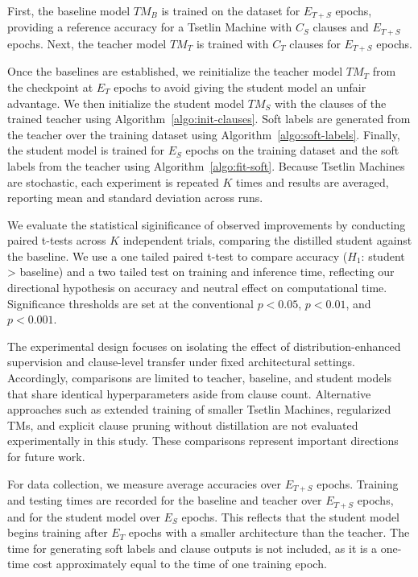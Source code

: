 \documentclass[sn-mathphys-num]{sn-jnl}%
\theoremstyle{thmstyleone}%
\theoremstyle{thmstyletwo}%
\theoremstyle{thmstylethree}%
\begin{document}
First, the baseline model $TM_B$ is trained on the dataset for $E_{T+S}$ epochs, providing a reference accuracy for a Tsetlin Machine with $C_S$ clauses and $E_{T+S}$ epochs. Next, the teacher model $TM_T$ is trained with $C_T$ clauses for $E_{T+S}$ epochs.

Once the baselines are established, we reinitialize the teacher model $TM_T$ from the checkpoint at $E_T$ epochs to avoid giving the student model an unfair advantage. We then initialize the student model $TM_S$ with the clauses of the trained teacher using Algorithm~\ref{algo:init-clauses}. Soft labels are generated from the teacher over the training dataset using Algorithm~\ref{algo:soft-labels}. Finally, the student model is trained for $E_S$ epochs on the training dataset and the soft labels from the teacher using Algorithm~\ref{algo:fit-soft}. Because Tsetlin Machines are stochastic, each experiment is repeated $K$ times and results are averaged, reporting mean and standard deviation across runs. 

We evaluate the statistical siginificance of observed improvements by conducting paired t-tests across $K$ independent trials, comparing the distilled student against the baseline. 
We use a one tailed paired t-test to compare accuracy ($H_1$: student > baseline) and a two tailed test on training and inference time, reflecting our directional hypothesis on accuracy and neutral effect on computational time. Significance thresholds are set at the conventional $p < 0.05$, $p < 0.01$, and $p < 0.001$.

The experimental design focuses on isolating the effect of distribution-enhanced supervision and clause-level transfer under fixed architectural settings. Accordingly, comparisons are limited to teacher, baseline, and student models that share identical hyperparameters aside from clause count. Alternative approaches such as extended training of smaller Tsetlin Machines, regularized TMs, and explicit clause pruning without distillation are not evaluated experimentally in this study. These comparisons represent important directions for future work.

For data collection, we measure average accuracies over $E_{T+S}$ epochs. Training and testing times are recorded for the baseline and teacher over $E_{T+S}$ epochs, and for the student model over $E_S$ epochs. This reflects that the student model begins training after $E_T$ epochs with a smaller architecture than the teacher. The time for generating soft labels and clause outputs is not included, as it is a one-time cost approximately equal to the time of one training epoch.
\end{document}
